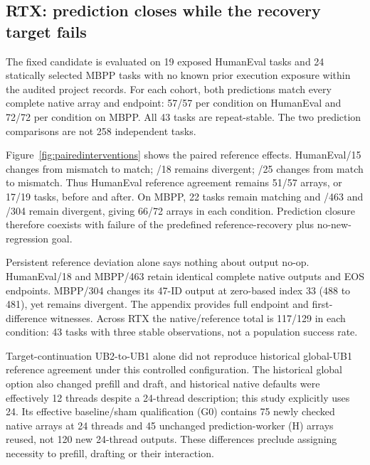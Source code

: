 \subsection{RTX: prediction closes while the recovery target fails}
The fixed candidate is evaluated on 19 exposed HumanEval tasks and 24 statically selected MBPP tasks with no known prior execution exposure within the audited project records. For each cohort, both predictions match every complete native array and endpoint: 57/57 per condition on HumanEval and 72/72 per condition on MBPP. All 43 tasks are repeat-stable. The two prediction comparisons are not 258 independent tasks.

Figure~\ref{fig:pairedinterventions} shows the paired reference effects. HumanEval/15 changes from mismatch to match; /18 remains divergent; /25 changes from match to mismatch. Thus HumanEval reference agreement remains 51/57 arrays, or 17/19 tasks, before and after. On MBPP, 22 tasks remain matching and /463 and /304 remain divergent, giving 66/72 arrays in each condition. Prediction closure therefore coexists with failure of the predefined reference-recovery plus no-new-regression goal. 


Persistent reference deviation alone says nothing about output no-op. HumanEval/18 and MBPP/463 retain identical complete native outputs and EOS endpoints. MBPP/304 changes its 47-ID output at zero-based index 33 (488 to 481), yet remains divergent. The appendix provides full endpoint and first-difference witnesses. Across RTX the native/reference total is 117/129 in each condition: 43 tasks with three stable observations, not a population success rate.

Target-continuation UB2-to-UB1 alone did not reproduce historical global-UB1 reference agreement under this controlled configuration. The historical global option also changed prefill and draft, and historical native defaults were effectively 12 threads despite a 24-thread description; this study explicitly uses 24. Its effective baseline/sham qualification (G0) contains 75 newly checked native arrays at 24 threads and 45 unchanged prediction-worker (H) arrays reused, not 120 new 24-thread outputs. These differences preclude assigning necessity to prefill, drafting or their interaction.
